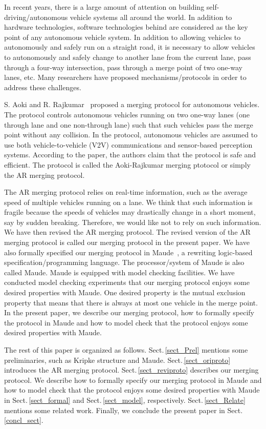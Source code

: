 \documentclass[10pt, conference, compsocconf]{IEEEtran}
\begin{document}
In recent years, there is a large amount of attention on building
self-driving/autonomous vehicle systems all around the world.  In
addition to hardware technologies, software technologies behind are
considered as the key point of any autonomous vehicle system.  In
addition to allowing vehicles to autonomously and safely run on a
straight road, it is necessary to allow vehicles to autonomously and
safely change to another lane from the current lane, pass through a
four-way intersection, pass through a merge point of two one-way
lanes, etc. Many researchers have proposed mechanisms/protocols in
order to address these challenges.

S. Aoki and R. Rajkumar~\cite{10.1145/3055004.3055028} proposed a
merging protocol for autonomous vehicles. The protocol controls
autonomous vehicles running on two one-way lanes (one through lane and
one non-through lane) such that such vehicles pass the merge point
without any collision. In the protocol, autonomous vehicles are
assumed to use both vehicle-to-vehicle (V2V) communications and
sensor-based perception systems.  According to the paper, the authors
claim that the protocol is safe and efficient. The protocol is called
the Aoki-Rajkumar merging ptotocol or simply the AR merging protocol.

The AR merging protocol relies on real-time information, such as the
average speed of multiple vehicles running on a lane. We think that
such information is fragile because the speeds of vehicles may
drastically change in a short moment, say by sudden
breaking. Therefore, we would like not to rely on such information. We
have then revised the AR merging protocol. The revised version of the
AR merging protocol is called our merging protocol in the present
paper. We have also formally specified our merging protocol in
Maude~\cite{Clavel2007LNCS}, a rewriting logic-based
specification/programming language. The processor/system of Maude is
also called Maude. Maude is equipped with model checking
facilities. We have conducted model checking experiments that our
merging protocol enjoys some desired properties with Maude. One
desired property is the mutual exclusion property that means that
there is always at most one vehicle in the merge point.  In the
present paper, we describe our merging protocol, how to formally
specify the protocol in Maude and how to model check that the protocol
enjoys some desired properties with Maude.

The rest of this paper is organized as follows. Sect.\,\ref{sect_Prel}
mentions some preliminaries, such as Kripke structure and Maude.
Sect.\,\ref{sect_oriproto} introduces the AR merging protocol.
Sect.\,\ref{sect_reviproto} describes our merging protocol.  We
describe how to formally specify our merging protocol in Maude and how
to model check that the protocol enjoys some desired properties with
Maude in Sect.\,\ref{sect_formal} and Sect.\,\ref{sect_model},
respectively.  Sect.\,\ref{sect_Relate} mentions some related work.
Finally, we conclude the present paper in Sect.\,\ref{concl_sect}.
\end{document}
